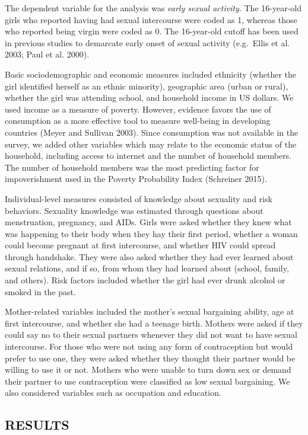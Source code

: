 \documentclass[
]{article}
\begin{document}
The dependent variable for the analysis was \emph{early sexual
activity}. The 16-year-old girls who reported having had sexual
intercourse were coded as 1, whereas those who reported being virgin
were coded as 0. The 16-year-old cutoff has been used in previous
studies to demarcate early onset of sexual activity (e.g.~Ellis et al.
2003; Paul et al. 2000).

Basic sociodemographic and economic measures included ethnicity (whether
the girl identified herself as an ethnic minority), geographic area
(urban or rural), whether the girl was attending school, and household
income in US dollars. We used income as a measure of poverty. However,
evidence favors the use of consumption as a more effective tool to
measure well-being in developing countries (Meyer and Sullivan 2003).
Since consumption was not available in the survey, we added other
variables which may relate to the economic status of the household,
including access to internet and the number of household members. The
number of household members was the most predicting factor for
impoverishment used in the Poverty Probability Index (Schreiner 2015).

Individual-level measures consisted of knowledge about sexuality and
risk behaviors. Sexuality knowledge was estimated through questions
about menstruation, pregnancy, and AIDs. Girls were asked whether they
knew what was happening to their body when they hay their first period,
whether a woman could become pregnant at first intercourse, and whether
HIV could spread through handshake. They were also asked whether they
had ever learned about sexual relations, and if so, from whom they had
learned about (school, family, and others). Risk factors included
whether the girl had ever drunk alcohol or smoked in the past.

Mother-related variables included the mother's sexual bargaining
ability, age at first intercourse, and whether she had a teenage birth.
Mothers were asked if they could say no to their sexual partners
whenever they did not want to have sexual intercourse. For those who
were not using any form of contraception but would prefer to use one,
they were asked whether they thought their partner would be willing to
use it or not. Mothers who were unable to turn down sex or demand their
partner to use contraception were classified as low sexual bargaining.
We also considered variables such as occupation and education.

\hypertarget{results}{%
\subsection{RESULTS}\label{results}}
\end{document}
